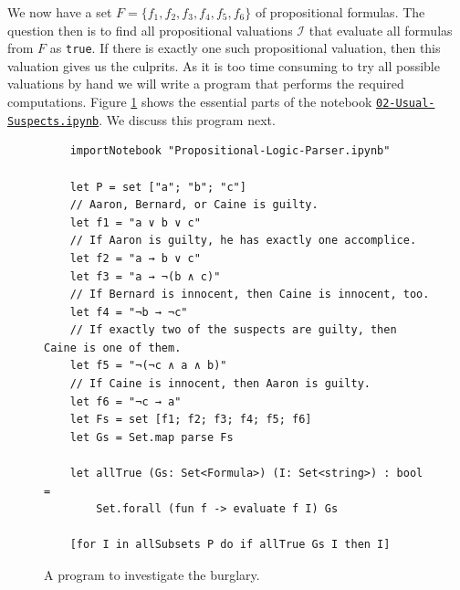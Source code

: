 We now have a set $F = \{ f_1, f_2, f_3, f_4, f_5, f_6 \}$ of propositional formulas.
The question then is to find all propositional valuations $\mathcal{I}$ that evaluate all formulas from $F$ as
\texttt{true}.  If there is exactly one such propositional valuation, then this valuation gives us the culprits.
As it is too time consuming to try all possible valuations by hand we will write a program that performs the
required computations.
Figure \ref{fig:Usual-Suspects.ipynb} shows the essential parts of the notebook
\href{https://github.com/karlstroetmann/Logic/blob/master/F-Sharp/Chapter-4/02-Usual-Suspects.ipynb}{\texttt{02-Usual-Suspects.ipynb}}.
We discuss this program next.

\begin{figure}[!ht]
  \centering
\begin{verbatim}
    importNotebook "Propositional-Logic-Parser.ipynb"

    let P = set ["a"; "b"; "c"]
    // Aaron, Bernard, or Caine is guilty.
    let f1 = "a ∨ b ∨ c"
    // If Aaron is guilty, he has exactly one accomplice.
    let f2 = "a → b ∨ c"
    let f3 = "a → ¬(b ∧ c)"
    // If Bernard is innocent, then Caine is innocent, too.
    let f4 = "¬b → ¬c"
    // If exactly two of the suspects are guilty, then Caine is one of them.
    let f5 = "¬(¬c ∧ a ∧ b)"
    // If Caine is innocent, then Aaron is guilty.
    let f6 = "¬c → a"
    let Fs = set [f1; f2; f3; f4; f5; f6]
    let Gs = Set.map parse Fs

    let allTrue (Gs: Set<Formula>) (I: Set<string>) : bool =
        Set.forall (fun f -> evaluate f I) Gs

    [for I in allSubsets P do if allTrue Gs I then I]
\end{verbatim}
\vspace*{-0.3cm}
  \caption{A program to investigate the burglary.}
  \label{fig:Usual-Suspects.ipynb}
\end{figure}

